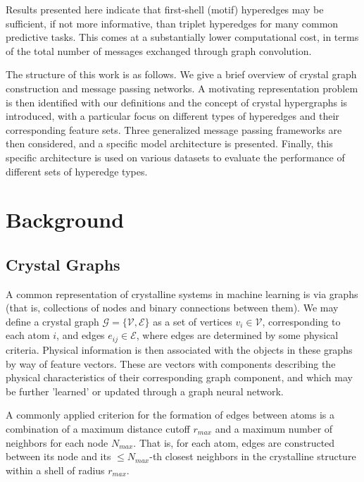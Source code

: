\documentclass[10pt,a4paper,twocolumn]{article}
\begin{document}
Results presented here indicate that first-shell (motif) hyperedges may be sufficient, if not more informative, than triplet hyperedges for many common predictive tasks. This comes at a substantially lower computational cost, in terms of the total number of messages exchanged through graph convolution.

The structure of this work is as follows. We give a brief overview of crystal graph construction and message passing networks. A motivating representation problem is then identified with our definitions and the concept of crystal hypergraphs is introduced, with a particular focus on different types of hyperedges and their corresponding feature sets. Three generalized message passing frameworks are then considered, and a specific model architecture is presented. Finally, this specific architecture is used on various datasets to evaluate the performance of different sets of hyperedge types.

\section{Background}
\subsection{Crystal Graphs}
A common representation of crystalline systems in machine learning is via graphs (that is, collections of nodes and binary connections between them). We may define a crystal graph $\mathcal{G}=\lbrace \mathcal{V},\mathcal{E}\rbrace$ as a set of vertices $v_i\in\mathcal{V}$, corresponding to each atom $i$, and edges $e_{ij}\in\mathcal{E}$, where edges are determined by some physical criteria. Physical information is then associated with the objects in these graphs by way of feature vectors. These are vectors with components describing the physical characteristics of their corresponding graph component, and which may be further 'learned' or updated through a graph neural network.


A commonly applied criterion for the formation of edges between atoms is a combination of a maximum distance cutoff $r_{max}$ and a maximum number of neighbors for each node $N_{max}$. That is, for each atom, edges are constructed between its node and its $\leq N_{max}$-th closest neighbors in the crystalline structure within a shell of radius $r_{max}$.
\end{document}
